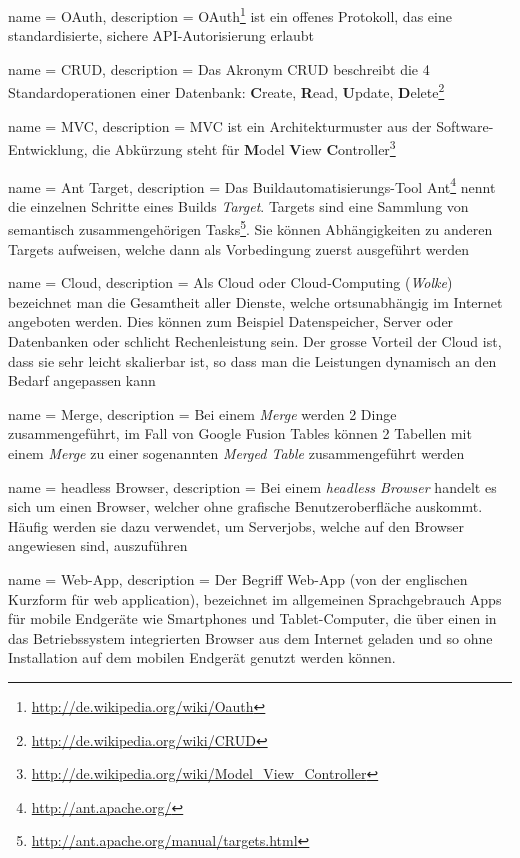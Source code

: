  {
	name = OAuth,
	description = {OAuth\footnote{\url{http://de.wikipedia.org/wiki/Oauth}} ist ein offenes Protokoll, das eine standardisierte, sichere API-Autorisierung erlaubt}
}

 {
	name = CRUD,
	description = {Das Akronym CRUD beschreibt die 4 Standardoperationen einer Datenbank: \textbf{C}reate, \textbf{R}ead, \textbf{U}pdate, \textbf{D}elete\footnote{\url{http://de.wikipedia.org/wiki/CRUD}}}
}

 {
	name = MVC,
	description = {MVC ist ein Architekturmuster aus der Software-Entwicklung, die Abkürzung steht für \textbf{M}odel \textbf{V}iew \textbf{C}ontroller\footnote{\url{http://de.wikipedia.org/wiki/Model_View_Controller}}}
}

 {
	name = Ant Target,
	description = {Das Buildautomatisierungs-Tool Ant\footnote{\url{http://ant.apache.org/}} nennt die einzelnen Schritte eines Builds \emph{Target}. Targets sind eine Sammlung von semantisch zusammengehörigen Tasks\footnote{\url{http://ant.apache.org/manual/targets.html}}. Sie können Abhängigkeiten zu anderen Targets aufweisen, welche dann als Vorbedingung zuerst ausgeführt werden}
}

 {
	name = Cloud,
	description = {Als Cloud oder Cloud-Computing (\emph{Wolke}) bezeichnet man die Gesamtheit aller Dienste, welche ortsunabhängig im Internet angeboten werden. Dies können zum Beispiel Datenspeicher, Server oder Datenbanken oder schlicht Rechenleistung sein. Der grosse Vorteil der Cloud ist, dass sie sehr leicht skalierbar ist, so dass man  die Leistungen dynamisch an den Bedarf angepassen kann\cite{cloud}}
}

 {
	name = Merge,
	description = {Bei einem \emph{Merge} werden 2 Dinge zusammengeführt, im Fall von Google Fusion Tables können 2 Tabellen mit einem \emph{Merge} zu einer sogenannten \emph{Merged Table} zusammengeführt werden}
}

 {
	name = headless Browser,
	description = {Bei einem \emph{headless Browser} handelt es sich um einen Browser, welcher ohne grafische Benutzeroberfläche auskommt. Häufig werden sie dazu verwendet, um Serverjobs, welche auf den Browser angewiesen sind, auszuführen}
}

 {
	name = Web-App,
	description = {Der Begriff Web-App (von der englischen Kurzform für web application), bezeichnet im allgemeinen Sprachgebrauch Apps für mobile Endgeräte wie Smartphones und Tablet-Computer, die über einen in das Betriebssystem integrierten Browser aus dem Internet geladen und so ohne Installation auf dem mobilen Endgerät genutzt werden können.\cite{webapp}}
}